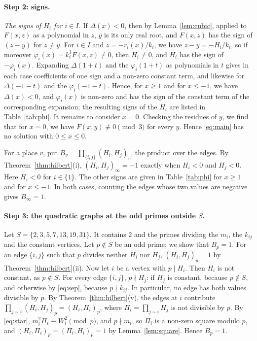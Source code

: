 \documentclass[11pt]{article}
\begin{document}
\paragraph{Step 2: signs.} \emph{The signs of $H_i$ for $i\in I$.} If $\Delta(x)<0$, then by Lemma~\ref{lem:cubic}, applied to $F(x,z)$ as a polynomial in $z$, $y$ is its only real root, and $F(x,z)$ has the sign of $(z-y)$ for $z\neq y$. For $i\in I$ and $z=-r_i(x)/k_i$, we have $z-y=-H_i/k_i$, so if moreover $\varphi_i(x)=k_i^3F(x,z)\neq0$, then $H_i\neq0$, and $H_i$ has the sign of $-\varphi_i(x)$. Expanding $\Delta(1+t)$ and the $\varphi_i(1+t)$ as polynomials in $t$ gives in each case coefficients of one sign and a non-zero constant term, and likewise for $\Delta(-1-t)$ and the $\varphi_i(-1-t)$. Hence, for $x\geq1$ and for $x\leq-1$, we have $\Delta(x)<0$, and $\varphi_i(x)$ is non-zero and has the sign of the constant term of the corresponding expansion; the resulting signs of the $H_i$ are listed in Table~\ref{tab:phi}. It remains to consider $x=0$. Checking the residues of $y$, we find that for $x=0$, we have $F(x,y)\not\equiv0\pmod{3}$ for every $y$. Hence \eqref{eq:main} has no solution with $0\leq x\leq0$.

For a place $v$, put $B_v=\prod_{\{i,j\}}(H_i,H_j)_v$, the product over the edges. By Theorem~\ref{thm:hilbert}(i), $(H_i,H_j)_\infty=-1$ exactly when $H_i<0$ and $H_j<0$. Here $H_i<0$ for $i\in\{1\}$. The other signs are given in Table~\ref{tab:phi} for $x\geq1$ and for $x\leq-1$. In both cases, counting the edges whose two values are negative gives $B_\infty=1$.

\paragraph{Step 3: the quadratic graphs at the odd primes outside $S$.} Let $S=\{2,\allowbreak 3,\allowbreak 5,\allowbreak 7,\allowbreak 13,\allowbreak 19,\allowbreak 31\}$. It contains $2$ and the primes dividing the $m_{i}$, the $k_{ij}$ and the constant vertices. Let $p\notin S$ be an odd prime; we show that $B_p=1$. For an edge $\{i,j\}$ such that $p$ divides neither $H_i$ nor $H_j$, $(H_i,H_j)_p=1$ by Theorem~\ref{thm:hilbert}(ii). Now let $i$ be a vertex with $p\mid H_i$. Then $H_i$ is not constant, as $p\notin S$. For every edge $\{i,j\}$, $p\nmid H_j$: if $H_j$ is constant, because $p\notin S$, and otherwise by \eqref{eq:sep}, because $p\nmid k_{ij}$. In particular, no edge has both values divisible by $p$. By Theorem~\ref{thm:hilbert}(v), the edges at $i$ contribute $\prod_{j\sim i}(H_i,H_j)_p=(H_i,\Pi_i)_p$, where $\Pi_i=\prod_{j\sim i}H_j$ is not divisible by $p$. By \eqref{eq:star}, $m_i^2\Pi_i\equiv W_i^2\pmod p$, and $p\nmid m_i$, so $\Pi_i$ is a non-zero square modulo $p$, and $(H_i,\Pi_i)_p=(\Pi_i,H_i)_p=1$ by Lemma~\ref{lem:square}. Hence $B_p=1$.
\end{document}
